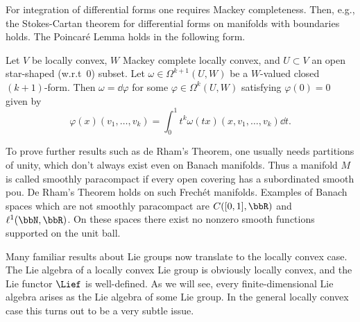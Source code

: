 For integration of differential forms one requires Mackey completeness. Then, e.g., the Stokes-Cartan theorem for differential forms on manifolds with boundaries holds. The Poincar\'e Lemma holds in the following form.

\begin{lem}
    Let $V$ be locally convex, $W$ Mackey complete locally convex, and $U\subset V$ an open star-shaped (w.r.t\ $0$) subset. Let $\omega\in \Omega^{k+1}(U,W)$ be a $W$-valued closed $(k+1)$-form. Then $\omega=\dd \varphi$ for some $\varphi\in \Omega^k(U,W)$ satisfying $\varphi(0)=0$ given by
    \[\varphi(x)(v_1,\ldots,v_k)=\int_0^1 t^k\omega(tx)(x,v_1,\ldots,v_k)\dd t.\]
\end{lem}

To prove further results such as de Rham's Theorem, one usually needs partitions of unity, which don't always exist even on Banach manifolds. Thus a manifold $M$ is called smoothly paracompact if every open covering has a subordinated smooth \gls{pou}. De Rham's Theorem holds on such Frech\'et manifolds. Examples of Banach spaces which are not smoothly paracompact are $C([0,1],\bbR)$ and $\ell^1(\bbN,\bbR)$. On these spaces there exist no nonzero smooth functions supported on the unit ball.


Many familiar results about Lie groups now translate to the locally convex case. The Lie algebra of a locally convex Lie group is obviously locally convex, and the Lie functor $\Lief$ is well-defined. As we will see, every finite-dimensional Lie algebra arises as the Lie algebra of some Lie group. In the general locally convex case this turns out to be a very subtle issue.

